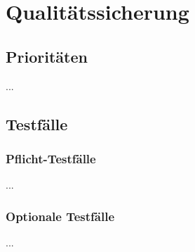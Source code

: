 %
%


\chapter{Qualitätssicherung}
\label{Qualitätssicherung}


\section{Prioritäten}

...
\\


\section{Testfälle}

\subsection{Pflicht-Testfälle}

...
\\


\subsection{Optionale Testfälle}

...
\\
